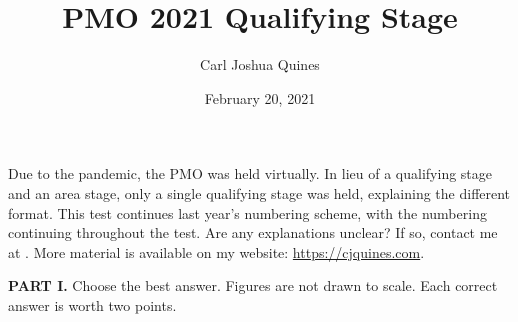 \documentclass[11pt,paper=letter]{scrartcl}
\begin{document}
\title{PMO 2021 Qualifying Stage}
\author{Carl Joshua Quines}
\date{February 20, 2021}

\maketitle

Due to the pandemic, the PMO was held virtually. In lieu of a qualifying stage and an area stage, only a single qualifying stage was held, explaining the different format. This test continues last year's numbering scheme, with the numbering continuing throughout the test. Are any explanations unclear? If so, contact me at . More material is available on my website: \url{https://cjquines.com}.

\textbf{PART I.} Choose the best answer. Figures are not drawn to scale. Each correct answer is worth two points.
\end{document}
